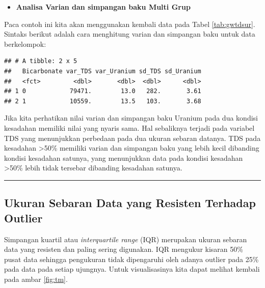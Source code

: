 \documentclass[]{book}
\newenvironment{Shaded}{\begin{snugshade}}{\end{snugshade}}
\newcommand{\KeywordTok}[1]{\textcolor[rgb]{0.13,0.29,0.53}{\textbf{#1}}}
\newcommand{\DataTypeTok}[1]{\textcolor[rgb]{0.13,0.29,0.53}{#1}}
\newcommand{\StringTok}[1]{\textcolor[rgb]{0.31,0.60,0.02}{#1}}
\newcommand{\OperatorTok}[1]{\textcolor[rgb]{0.81,0.36,0.00}{\textbf{#1}}}
\newcommand{\NormalTok}[1]{#1}
\providecommand{\tightlist}{%
  \setlength{\itemsep}{0pt}\setlength{\parskip}{0pt}}
\begin{document}
\begin{itemize}
\tightlist
\item
  \textbf{Analisa Varian dan simpangan baku Multi Grup}
\end{itemize}

Paca contoh ini kita akan menggunakan kembali data pada Tabel
\ref{tab:gwtdsur}. Sintaks berikut adalah cara menghitung varian dan
simpangan baku untuk data berkelompok:

\begin{Shaded}
\end{Shaded}

\begin{verbatim}
## # A tibble: 2 x 5
##   Bicarbonate var_TDS var_Uranium sd_TDS sd_Uranium
##   <fct>         <dbl>       <dbl>  <dbl>      <dbl>
## 1 0            79471.        13.0   282.       3.61
## 2 1            10559.        13.5   103.       3.68
\end{verbatim}

Jika kita perhatikan nilai varian dan simpangan baku Uranium pada dua
kondisi kesadahan memiliki nilai yang nyaris sama. Hal sebaliknya
terjadi pada variabel TDS yang menunjukkan perbedaan pada dua ukuran
sebaran datanya. TDS pada kesadahan \textgreater{}50\% memiliki varian
dan simpangan baku yang lebih kecil dibanding kondisi kesadahan satunya,
yang menunjukkan data pada kondisi kesadahan \textgreater{}50\% lebih
tidak tersebar dibanding kesadahan satunya.

\begin{center}\rule{0.5\linewidth}{\linethickness}\end{center}

\subsection{Ukuran Sebaran Data yang Resisten Terhadap
Outlier}\label{ukuran-sebaran-data-yang-resisten-terhadap-outlier}

Simpangan kuartil atau \emph{interquartile range} (IQR) merupakan ukuran
sebaran data yang resisten dan paling sering digunakan. IQR mengukur
kisaran 50\% pusat data sehingga pengukuran tidak dipengaruhi oleh
adanya outlier pada 25\% pada data pada setiap ujungnya. Untuk
visualisasinya kita dapat melihat kembali pada ambar \ref{fig:tm}.
\end{document}
